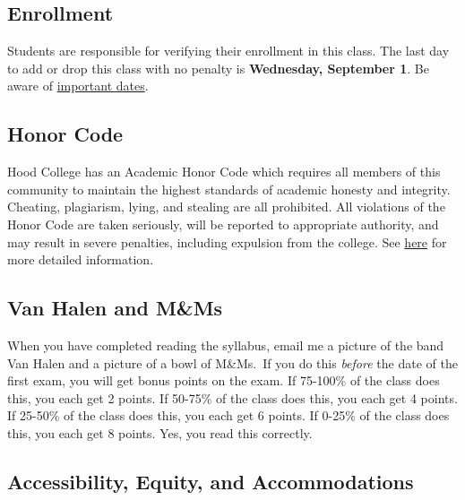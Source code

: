 \documentclass{article}
\begin{document}
\hypertarget{enrollment}{%
\subsection{Enrollment}\label{enrollment}}

Students are responsible for verifying their enrollment in this class.
The last day to add or drop this class with no penalty is
\textbf{Wednesday, September 1}. Be aware of
\href{https://www.hood.edu/offices-services/registrars-office/academic-calendar}{important
dates}.

\hypertarget{honor-code}{%
\subsection{Honor Code}\label{honor-code}}

Hood College has an Academic Honor Code which requires all members of
this community to maintain the highest standards of academic honesty and
integrity. Cheating, plagiarism, lying, and stealing are all prohibited.
All violations of the Honor Code are taken seriously, will be reported
to appropriate authority, and may result in severe penalties, including
expulsion from the college. See
\href{http://hood.smartcatalogiq.com/en/2016-2017/Catalog/The-Spirit-of-Hood/The-Academic-Honor-Code-and-Code-of-Conduct}{here}
for more detailed information.

\hypertarget{van-halen-and-mms}{%
\subsection{Van Halen and M\&Ms}\label{van-halen-and-mms}}

When you have completed reading the syllabus, email me a picture of the
band Van Halen and a picture of a bowl of M\&Ms.~If you do this
\emph{before} the date of the first exam, you will get bonus points on
the exam. If 75-100\% of the class does this, you each get 2 points. If
50-75\% of the class does this, you each get 4 points. If 25-50\% of the
class does this, you each get 6 points. If 0-25\% of the class does
this, you each get 8 points. Yes, you read this correctly.

\hypertarget{accessibility-equity-and-accommodations}{%
\subsection{Accessibility, Equity, and
Accommodations}\label{accessibility-equity-and-accommodations}}
\end{document}
